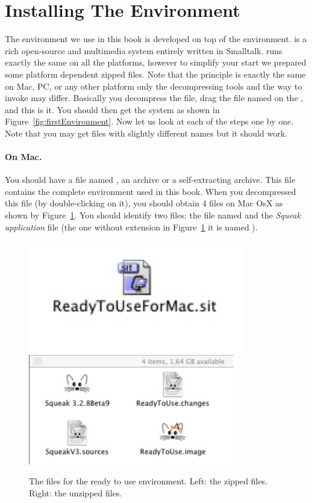 \section{Installing The Environment}
The environment we use in this book is developed on top of the \sq environment. \sq is a rich open-source and multimedia system entirely written in Smalltalk. 
\sq runs exactly the same on all the platforms, however to simplify your start we prepared some platform dependent zipped files. Note that the principle is exactly the same on Mac, PC, or any other platform only the decompressing tools and the way to invoke \sq may differ. Basically you decompress the file, drag the file named  on the , and this is it. You should then get the system as shown in Figure~\ref{fig:firstEnvironment}. Now let us look at each of the steps one by one. Note that you may get files with slightly different names but it should work. 

\paragraph{On Mac.}
You should have a file named , an archive or  a self-extracting archive. This file contains the complete environment used in this book. When you decompressed this file (by double-clicking on it), you should obtain 4 files on Mac OsX as shown by Figure~\ref{fig:macfiles}. You should identify two files: the file named  and the \emph{Squeak application} file (the one without extension in Figure~\ref{fig:macfiles} it is named ).

\begin{figure}[!h]\centerline{\includegraphics{readyToUseForMacZip}\includegraphics[width=9cm]{macFiles}}
\caption{The files for the ready to use environment. Left: the zipped files. Right: the unzipped files.\label{fig:macfiles}}\end{figure}

